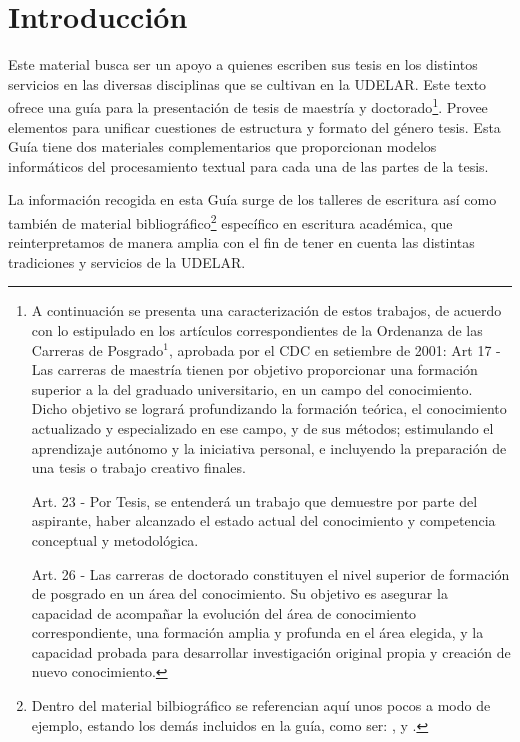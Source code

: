 \chapter{Introducción}

Este material busca ser un apoyo a quienes escriben sus tesis en los distintos servicios en las diversas disciplinas que se cultivan en la \gls{UDELAR}. Este texto ofrece una guía para la presentación de tesis de maestría y doctorado\footnote{A continuación se presenta una caracterización de estos trabajos, de acuerdo con lo estipulado en los artículos correspondientes de la Ordenanza de las Carreras de Posgrado$^1$, aprobada por el CDC en setiembre de 2001: Art 17 - Las carreras de maestría tienen por objetivo proporcionar una formación superior a 	la del graduado universitario, en un campo del conocimiento. Dicho objetivo se logrará 	profundizando la formación teórica, el conocimiento actualizado y especializado en ese 	campo, y de sus métodos; estimulando el aprendizaje autónomo y la iniciativa personal, e incluyendo la preparación de una tesis o trabajo creativo finales. 

\begin{minipage}{0.973\textwidth}
Art. 23 - Por Tesis, se entenderá un trabajo que demuestre por parte del aspirante, haber 	alcanzado el estado actual del conocimiento y competencia conceptual y metodológica.
	
	Art. 26 - Las carreras de doctorado constituyen el nivel superior de formación de posgrado 	en un área del conocimiento. Su objetivo es asegurar la capacidad de acompañar la 	evolución del área de conocimiento correspondiente, una formación amplia y profunda en el 	área elegida, y la capacidad probada para desarrollar investigación original propia y creación 	de nuevo conocimiento.
\end{minipage}	 
}. Provee elementos para unificar cuestiones de estructura y formato del género tesis. Esta Guía tiene dos materiales complementarios que proporcionan modelos informáticos del procesamiento textual para cada una de las partes de la tesis.


La información  recogida en esta Guía surge de los talleres de escritura así como también de material bibliográfico\footnote{Dentro del material bilbiográfico se referencian aquí unos pocos a modo de ejemplo, estando los demás incluidos en la guía, como ser: \cite{guia1}, \cite{guia2} y \cite{guia9}.} específico en escritura académica, que reinterpretamos de manera amplia con el fin de tener en cuenta las distintas tradiciones y servicios de la \gls{UDELAR}. 

